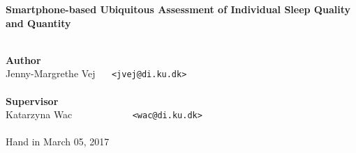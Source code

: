 \documentclass[a4paper,oneside]{memoir}
\begin{document}
    \thispagestyle{empty}
    \begin{adjustwidth}{-3cm}{-1.5cm}
    \vspace*{3.5cm}
    \textbf{\huge Smartphone-based Ubiquitous Assessment of Individual Sleep Quality and Quantity} \\
    \vspace*{.1cm} \\
    \begin{tabbing}
    \textbf{\Large Author} \\
    Jenny-Margrethe Vej ~~ \= \texttt{<jvej@di.ku.dk>} \\
    \vspace*{.1cm} \\
    \textbf{\Large Supervisor} \\
    Katarzyna Wac ~~~~~~~~~~~ \= \texttt{<wac@di.ku.dk>} \\
    \vspace*{.1cm} \\
    Hand in March 05, 2017
    \\[11.7cm]
    \end{tabbing}
    \end{adjustwidth}
    \ClearWallPaper
\end{document}
